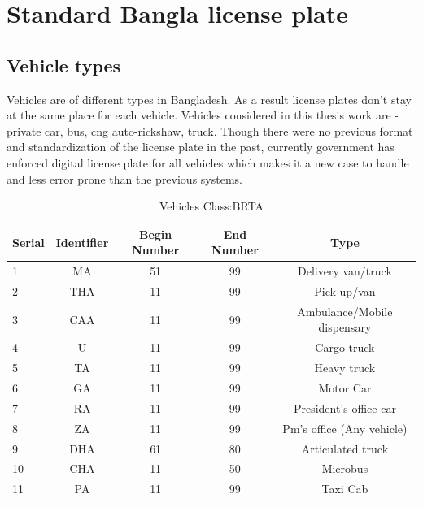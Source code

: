 \documentclass{standalone}
\begin{document}
\section{Standard Bangla license plate}
\subsection{Vehicle types}
Vehicles are of different types in Bangladesh. As a result license plates don't stay at the same place for each vehicle. Vehicles considered in this thesis work are - private car, bus, cng auto-rickshaw, truck. Though there were no previous format and standardization of the license plate in the past, currently government has enforced digital license plate for all vehicles which makes it a new case to handle and less error prone than the previous systems.

  
\begin{table}[hb]
	\centering
	\label{tab:error5}
	\begin{tabular}{|l|c|c|c|c|}
		\hline
		\multicolumn{1}{|c|}{Serial}
		& \multicolumn{1}{|c|}{Identifier}
		& \multicolumn{1}{|c|}{Begin Number} 
		& \multicolumn{1}{|c|}{End Number}
		& \multicolumn{1}{|c|}{Type} \\ 
		\hline
		    
		1  & MA  & 51 & 99 & Delivery van/truck \\ \hline
		2  & THA & 11 & 99 & Pick up/van \\ \hline
		3  & CAA & 11 & 99 & Ambulance/Mobile dispensary \\ \hline
		4  & U	 & 11 & 99 &	Cargo truck \\ \hline
		5  & TA	 & 11 & 99 & Heavy truck \\ \hline
		6  & GA  & 11 & 99 & Motor Car \\ \hline
		7  & RA	 & 11 & 99 & President's office car \\ \hline
		8  & ZA	 & 11 & 99 & Pm’s office (Any vehicle) \\ \hline
		9  & DHA & 61 & 80 & Articulated truck \\ \hline
		10 & CHA & 11 & 50 & Microbus \\ \hline
		11 & PA	 & 11 & 99 & Taxi Cab \\ \hline
		
	\end{tabular}
	\caption{Vehicles Class:BRTA \cite{brta}}
\end{table}

\par
\end{document}
